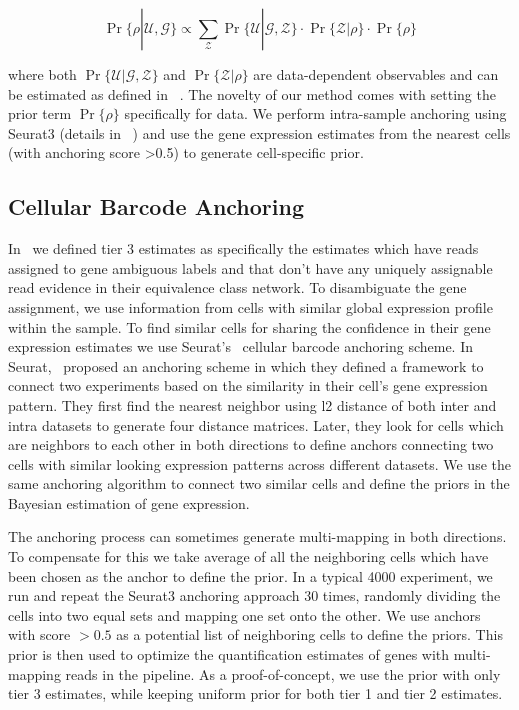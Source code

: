 \begin{equation}
    \Pr \{ \rho | \mathcal{U}, \mathcal{G} \} 
    \propto \sum_{\mathcal{Z}} \Pr\{ \mathcal{U} | \mathcal{G}, \mathcal{Z} \}
    \cdot \Pr\{ \mathcal{Z} | \rho \} \cdot \Pr\{ \rho \}
\end{equation}

where both $\Pr\{ \mathcal{U} | \mathcal{G}, \mathcal{Z} \}$ and $\Pr\{ \mathcal{Z} | \rho \}$ are 
data-dependent observables and can be estimated as defined in ~\citet{salmon}. The novelty of our method
comes with setting the prior term $\Pr\{ \rho \}$ specifically for \dscrnaseq data. We perform
intra-sample anchoring using Seurat3 (details in ~) and use the gene expression
estimates from the nearest cells (with anchoring score >0.5) to generate cell-specific prior.

\subsection{Cellular Barcode Anchoring}
\label{subsec:anchor}
In~ we defined tier 3 estimates as specifically the estimates which have reads assigned 
to gene ambiguous labels and that don't have any uniquely assignable read evidence in their equivalence 
class network. To disambiguate the gene assignment, we use 
information from cells with similar global expression profile within the sample. To find similar cells for sharing 
the confidence in their gene expression estimates we use Seurat's~\citep{seurat3} cellular
barcode anchoring scheme. In Seurat,~\citet{seurat3} proposed an anchoring scheme in which they 
defined a framework to connect two experiments based on the similarity in their cell's gene expression 
pattern. They first find the nearest neighbor using l2 distance of both inter and intra datasets to generate 
four distance matrices. Later, they look for cells which are neighbors to each other in both 
directions to define anchors connecting two cells with similar looking expression patterns 
across different \singlecell datasets. We use the same anchoring algorithm to connect two similar 
cells and define the priors in the Bayesian estimation of gene expression.

The anchoring process can sometimes generate multi-mapping in both directions. To compensate for this we take 
average of all the neighboring cells which have been chosen as the anchor to define the prior. In a typical 4000 \singlecell 
experiment, we run \alevin and repeat the Seurat3 anchoring approach $30$ times, randomly dividing 
the cells into two equal sets and mapping one set onto the other. We use anchors with score $>0.5$ as a potential list 
of neighboring cells to define the priors. This prior is then used to optimize the quantification estimates of genes 
with multi-mapping reads in the \alevin pipeline. As a proof-of-concept, we use the prior with only tier 3 estimates, 
while keeping uniform prior for both tier 1 and tier 2 estimates.


